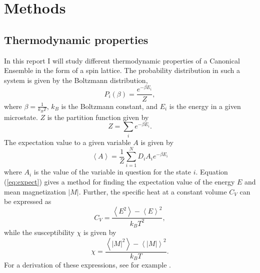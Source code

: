 \section{Methods}
\label{sec:methods}

\subsection{Thermodynamic properties}
In this report I will study different thermodynamic properties of a Canonical Ensemble in the form of a spin lattice. The probability distribution in such a system is given by the Boltzmann distribution,  
\begin{equation}
	P_i(\beta) =  \frac{e^{-\beta E_i}}{Z},
\end{equation}
where $\beta = \frac{1}{k_B T}$, $k_B$ is the Boltzmann constant, and $E_i$ is the energy in a given microstate. $Z$ is the partition function given by 
\begin{equation}
 Z = \sum_{i}  e^{-\beta E_i}.
\end{equation}
 The expectation value to a given variable $A$ is given by 
 \begin{equation}\label{eq:expect}
  \left\langle A\right\rangle = \frac{1}{Z}\sum_{i=1}^{N} D_i A_i  e^{- \beta E_i} 
 \end{equation}   
 where $A_i$ is the value of the variable in question for the state $i$. Equation (\ref{eq:expect}) gives a method for finding the expectation value of the energy $E$ and mean magnetization $|M|$. Further, the specific heat at a constant volume $C_V$ can be expressed as  
 \begin{equation}
	 C_V = \frac{\left\langle E^2\right\rangle - \left\langle E\right\rangle ^2}{k_BT^2},
 \end{equation}
 while the susceptibility $\chi$ is given by 
  \begin{equation}
  \chi = \frac{\left\langle |M|^2\right\rangle - \left\langle |M|\right\rangle ^2}{k_BT}.
  \end{equation}
 For a derivation of these expressions, see for example \cite{schroeder}.
 
